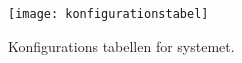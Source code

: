 \begin{figure}[h]
\texttt{[image: konfigurationstabel]}
\caption{Konfigurations tabellen for systemet.}
\label{tab:konfigurationsTabel}
\end{figure}